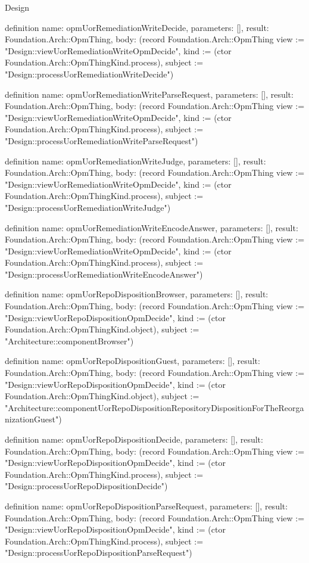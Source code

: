 \begin{lexlean}{Design}
\begin{semanticmodule}
definition{
  name: opmUorRemediationWriteDecide,
  parameters: [],
  result: Foundation.Arch::OpmThing,
  body: (record Foundation.Arch::OpmThing {view := "Design::viewUorRemediationWriteOpmDecide", kind := (ctor Foundation.Arch::OpmThingKind.process), subject := "Design::processUorRemediationWriteDecide"})
}

definition{
  name: opmUorRemediationWriteParseRequest,
  parameters: [],
  result: Foundation.Arch::OpmThing,
  body: (record Foundation.Arch::OpmThing {view := "Design::viewUorRemediationWriteOpmDecide", kind := (ctor Foundation.Arch::OpmThingKind.process), subject := "Design::processUorRemediationWriteParseRequest"})
}

definition{
  name: opmUorRemediationWriteJudge,
  parameters: [],
  result: Foundation.Arch::OpmThing,
  body: (record Foundation.Arch::OpmThing {view := "Design::viewUorRemediationWriteOpmDecide", kind := (ctor Foundation.Arch::OpmThingKind.process), subject := "Design::processUorRemediationWriteJudge"})
}

definition{
  name: opmUorRemediationWriteEncodeAnswer,
  parameters: [],
  result: Foundation.Arch::OpmThing,
  body: (record Foundation.Arch::OpmThing {view := "Design::viewUorRemediationWriteOpmDecide", kind := (ctor Foundation.Arch::OpmThingKind.process), subject := "Design::processUorRemediationWriteEncodeAnswer"})
}

definition{
  name: opmUorRepoDispositionBrowser,
  parameters: [],
  result: Foundation.Arch::OpmThing,
  body: (record Foundation.Arch::OpmThing {view := "Design::viewUorRepoDispositionOpmDecide", kind := (ctor Foundation.Arch::OpmThingKind.object), subject := "Architecture::componentBrowser"})
}

definition{
  name: opmUorRepoDispositionGuest,
  parameters: [],
  result: Foundation.Arch::OpmThing,
  body: (record Foundation.Arch::OpmThing {view := "Design::viewUorRepoDispositionOpmDecide", kind := (ctor Foundation.Arch::OpmThingKind.object), subject := "Architecture::componentUorRepoDispositionRepositoryDispositionForTheReorganizationGuest"})
}

definition{
  name: opmUorRepoDispositionDecide,
  parameters: [],
  result: Foundation.Arch::OpmThing,
  body: (record Foundation.Arch::OpmThing {view := "Design::viewUorRepoDispositionOpmDecide", kind := (ctor Foundation.Arch::OpmThingKind.process), subject := "Design::processUorRepoDispositionDecide"})
}

definition{
  name: opmUorRepoDispositionParseRequest,
  parameters: [],
  result: Foundation.Arch::OpmThing,
  body: (record Foundation.Arch::OpmThing {view := "Design::viewUorRepoDispositionOpmDecide", kind := (ctor Foundation.Arch::OpmThingKind.process), subject := "Design::processUorRepoDispositionParseRequest"})
}


\end{semanticmodule}
\end{lexlean}
